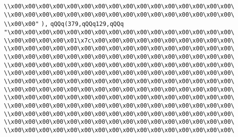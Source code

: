 \verb|\\x00\x00\x00\x00\x00\x00\x00\x00\x00\x00\x00\x00\x00\x00\x00\x00\|\newline
\verb|\\x00\x00\x00\x00\x00\x00\x00\x00\x00\x00\x00\x00\x00\x00\x00\x00\|\newline
\verb|\\x00\x00"|\newline
\verb|),|\newline
\verb|qQQq(379,qQQq129,qQQq|\newline
\verb|"\x00\x00\x00\x00\x00\x00\x00\x00\x00\x00\x00\x00\x00\x00\x00\x00\|\newline
\verb|\\x00\x00\x00\x00\x01\x7c\x00\x00\x00\x00\x00\x00\x00\x00\x00\x00\|\newline
\verb|\\x00\x00\x00\x00\x00\x00\x00\x00\x00\x00\x00\x00\x00\x00\x00\x00\|\newline
\verb|\\x00\x00\x00\x00\x00\x00\x00\x00\x00\x00\x00\x00\x00\x00\x00\x00\|\newline
\verb|\\x00\x00\x00\x00\x00\x00\x00\x00\x00\x00\x00\x00\x00\x00\x00\x00\|\newline
\verb|\\x00\x00\x00\x00\x00\x00\x00\x00\x00\x00\x00\x00\x00\x00\x00\x00\|\newline
\verb|\\x00\x00\x00\x00\x00\x00\x00\x00\x00\x00\x00\x00\x00\x00\x00\x00\|\newline
\verb|\\x00\x00\x00\x00\x00\x00\x00\x00\x00\x00\x00\x00\x00\x00\x00\x00\|\newline
\verb|\\x00\x00\x00\x00\x00\x00\x00\x00\x00\x00\x00\x00\x00\x00\x00\x00\|\newline
\verb|\\x00\x00\x00\x00\x00\x00\x00\x00\x00\x00\x00\x00\x00\x00\x00\x00\|\newline
\verb|\\x00\x00\x00\x00\x00\x00\x00\x00\x00\x00\x00\x00\x00\x00\x00\x00\|\newline
\verb|\\x00\x00\x00\x00\x00\x00\x00\x00\x00\x00\x00\x00\x00\x00\x00\x00\|\newline
\verb|\\x00\x00\x00\x00\x00\x00\x00\x00\x00\x00\x00\x00\x00\x00\x00\x00\|\newline
